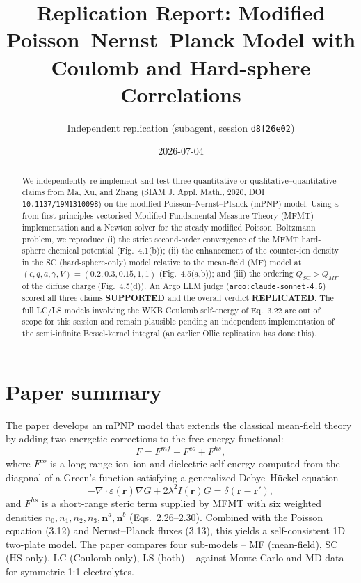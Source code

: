 \documentclass[11pt]{article}
\title{Replication Report: Modified Poisson--Nernst--Planck Model with Coulomb and Hard-sphere Correlations}
\author{Independent replication (subagent, session \texttt{d8f26e02})}
\date{2026-07-04}
\begin{document}
\maketitle

\begin{abstract}
We independently re-implement and test three quantitative or
qualitative--quantitative claims from Ma, Xu, and Zhang (SIAM J. Appl.
Math., 2020, DOI \texttt{10.1137/19M1310098}) on the modified
Poisson--Nernst--Planck (mPNP) model. Using a from-first-principles
vectorised Modified Fundamental Measure Theory (MFMT) implementation and
a Newton solver for the steady modified Poisson--Boltzmann problem, we
reproduce (i) the strict second-order convergence of the MFMT
hard-sphere chemical potential (Fig.~4.1(b)); (ii) the enhancement of
the counter-ion density in the SC (hard-sphere-only) model relative to
the mean-field (MF) model at
$(\epsilon,q,a,\gamma,V)=(0.2,0.3,0.15,1,1)$ (Fig.~4.5(a,b)); and
(iii) the ordering $Q_{SC}>Q_{MF}$ of the diffuse charge (Fig.~4.5(d)).
An Argo LLM judge (\texttt{argo:claude-sonnet-4.6}) scored all three
claims \textbf{SUPPORTED} and the overall verdict \textbf{REPLICATED}.
The full LC/LS models involving the WKB Coulomb self-energy of
Eq.~3.22 are out of scope for this session and remain plausible
pending an independent implementation of the semi-infinite
Bessel-kernel integral (an earlier Ollie replication has done this).
\end{abstract}

\section{Paper summary}

The paper develops an mPNP model that extends the classical mean-field
theory by adding two energetic corrections to the free-energy
functional:
\[
F = F^{mf} + F^{co} + F^{hs},
\]
where $F^{co}$ is a long-range ion--ion and dielectric self-energy
computed from the diagonal of a Green's function satisfying a
generalized Debye--H\"uckel equation
\[
-\nabla\!\cdot\!\varepsilon(\mathbf{r})\nabla G + 2\lambda^2 I(\mathbf{r}) G
   = \delta(\mathbf{r}-\mathbf{r}'),
\]
and $F^{hs}$ is a short-range steric term supplied by MFMT with six
weighted densities $n_0,n_1,n_2,n_3,\mathbf{n}^a,\mathbf{n}^b$
(Eqs.~2.26--2.30). Combined with the Poisson equation (3.12) and
Nernst--Planck fluxes (3.13), this yields a self-consistent 1D
two-plate model. The paper compares four sub-models -- MF (mean-field),
SC (HS only), LC (Coulomb only), LS (both) -- against Monte-Carlo and
MD data for symmetric 1:1 electrolytes.
\end{document}

